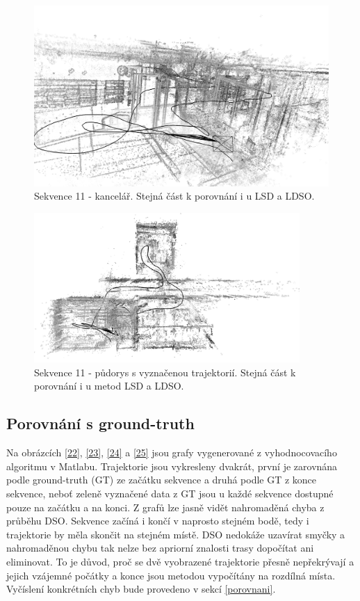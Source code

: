 \documentclass[12pt,a4paper]{report}
\begin{document}
\begin{figure}[H]
\centering
\includegraphics[width=1.0\textwidth]{img/DSO_11_kancl_b.png}
\caption{Sekvence 11 - kancelář. Stejná část k porovnání i u LSD a LDSO.}
\label{20}
\end{figure} 

\begin{figure}[H]
\centering
\includegraphics[width=0.9\textwidth]{img/DSO_11_top_b.png}
\caption{Sekvence 11 - půdorys s vyznačenou trajektorií. Stejná část k porovnání i u metod LSD a LDSO.}
\label{21}
\end{figure} 

\subsection*{Porovnání s ground-truth}
Na obrázcích \ref{22}, \ref{23}, \ref{24} a \ref{25} jsou grafy vygenerované z vyhodnocovacího algoritmu v Matlabu. Trajektorie jsou vykresleny dvakrát, první je zarovnána podle ground-truth (GT) ze začátku sekvence a druhá podle GT z konce sekvence, neboť zeleně vyznačené data z GT jsou u každé sekvence dostupné pouze na začátku a na konci. Z grafů lze jasně vidět nahromaděná chyba z průběhu DSO. Sekvence začíná i končí v naprosto stejném bodě, tedy i trajektorie by měla skončit na stejném místě. DSO nedokáže uzavírat smyčky a nahromaděnou chybu tak nelze bez apriorní znalosti trasy dopočítat ani eliminovat. To je důvod, proč se dvě vyobrazené trajektorie přesně nepřekrývají a jejich vzájemné počátky a konce jsou metodou vypočítány na rozdílná místa. Vyčíslení konkrétních chyb bude provedeno v sekcí \ref{porovnani}.
\end{document}
